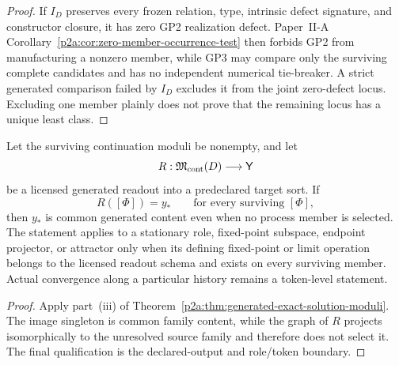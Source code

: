 \documentclass[12pt,a4paper]{article}
\begin{document}
\begin{proof}
If \(I_D\) preserves every frozen relation, type, intrinsic defect signature,
and constructor closure, it has zero GP2 realization defect.  Paper~II-A
Corollary~\ref{p2a:cor:zero-member-occurrence-test} then forbids GP2 from
manufacturing a nonzero member, while GP3 may compare only the surviving
complete candidates and has no independent numerical tie-breaker.  A strict
generated comparison failed by \(I_D\) excludes it from the joint zero-defect
locus.  Excluding one member plainly does not prove that the remaining locus
has a unique least class.
\end{proof}

\begin{corollary}
\label{p3a:cor:common-process-invariant}
Let the surviving continuation moduli be nonempty, and let
\[
 R:\mathfrak M_{\rm cont}(D)\longrightarrow\mathsf Y
\]
be a licensed generated readout into a predeclared target sort.  If
\[
 R([\Phi])=y_*
 \qquad
 \text{for every surviving }[\Phi],
\]
then \(y_*\) is common generated content even when no process member is
selected.  The statement applies to a stationary role, fixed-point subspace,
endpoint projector, or attractor only when its defining fixed-point or limit
operation belongs to the licensed readout schema and exists on every
surviving member.  Actual convergence along a particular history remains a
token-level statement.
\end{corollary}

\begin{proof}
Apply part~(iii) of
Theorem~\ref{p2a:thm:generated-exact-solution-moduli}.  The image singleton is
common family content, while the graph of \(R\) projects isomorphically to the
unresolved source family and therefore does not select it.  The final
qualification is the declared-output and role/token boundary.
\end{proof}
\end{document}
